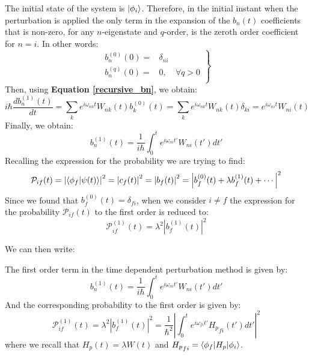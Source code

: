 The initial state of the system is $\ket{\phi_i}$. Therefore, in the initial instant when the perturbation is applied the only term in the expansion of the $b_n(t)$ coefficients that is non-zero, for any $n$-eigenstate and $q$-order, is the zeroth order coefficient for $n = i$. In other words:
\begin{equation}
    \left.
    \begin{matrix}
        b_n^{(0)}(0) =& \delta_{ni}&\\
        b_n^{(q)}(0) =& 0,& \forall q > 0 \\
    \end{matrix}\right\} 
\end{equation}
Then, using \textbf{Equation \ref{recursive_bn}}, we obtain:
\begin{equation}
    i\hbar \frac{d b_n^{(1)}(t)}{dt}  = \sum_k e^{i\omega_{nk}t}W_{nk}(t)  b_k^{(0)}(t) = \sum_k e^{i\omega_{nk}t}W_{nk}(t)  \delta_{ki} = e^{i\omega_{ni}t}W_{ni}(t) 
\end{equation}
Finally, we obtain:
\begin{equation}
    b_n^{(1)}(t) = \frac{1}{i\hbar}\int_0^t e^{i\omega_{ni}t'}W_{ni}(t')dt' 
\end{equation}
Recalling the expression for the probability we are trying to find:
\begin{equation}
    \mathcal{P}_{if}(t) = \left|\braket{\phi_f|\psi(t)}\right|^2 = \left| c_f(t) \right|^2 = \left|b_f(t)\right|^2 = \left|b_f^{(0)}(t) + \lambda b_f^{(1)}(t) + \cdots\right|^2
\end{equation}
Since we found that $b_f^{(0)}(t) = \delta_{fi}$, when we consider $i\neq f$ the expression for the probability $\mathcal{P}_{if}(t)$ to the first order is reduced to:
\begin{equation}
    \mathcal{P}_{if}^{(1)}(t) = \lambda^2\left| b_f^{(1)}(t) \right|^2
\end{equation}

We can then write:
\begin{definition}
    The first order term in the time dependent perturbation method is given by:
    \begin{equation}
        b_n^{(1)}(t) = \frac{1}{i\hbar}\int_0^t e^{i\omega_{ni}t'}W_{ni}(t')dt' 
    \end{equation}
    And the corresponding probability to the first order is given by:
    \begin{equation}
        \mathcal{P}_{if}^{(1)}(t) = \lambda^2\left| b_f^{(1)}(t) \right|^2 = \frac{1}{\hbar^2}\left|\int_0^t e^{i\omega_{fi}t'}{H_p}_{fi}(t')dt' \right|^2
    \end{equation}
    where we recall that $H_p(t) = \lambda W(t)$ and ${H_p}_{fi} = \braket{\phi_f|H_p|\phi_i}$.
\end{definition}

